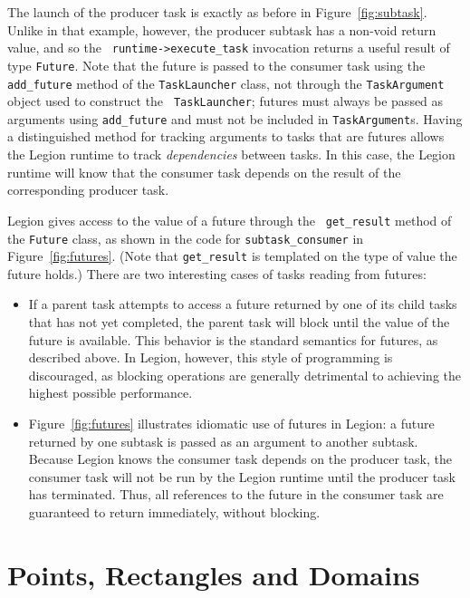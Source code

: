 \documentclass[11pt]{book}
\begin{document}
The launch of the producer task is exactly as before in
Figure~\ref{fig:subtask}.  Unlike in that example, however, the
producer subtask has a non-void return value, and so the {\tt
  runtime->execute\_task} invocation returns a useful result of type
{\tt Future}.  Note that the future is passed to the consumer task
using the {\tt add\_future} method of the {\tt TaskLauncher} class, not
through the {\tt TaskArgument} object used to construct the {\tt
  TaskLauncher}; futures must always be passed as arguments using {\tt add\_future}
and must not be included in {\tt TaskArgument}s.  Having a distinguished method for tracking arguments
to tasks that are futures allows the Legion runtime to track 
{\em dependencies} between tasks.  In this case, the Legion runtime 
will know that the consumer task depends on the result of the corresponding
producer task.

Legion gives access to the value of a future through the {\tt
  get\_result} method of the {\tt Future} class, as shown in the code
for {\tt subtask\_consumer} in Figure~\ref{fig:futures}.  (Note that
{\tt get\_result} is templated on the type of value the future holds.)
There are two interesting cases of tasks reading from futures:
\begin{itemize}

\item If a parent task attempts to access a future returned
by one of its child tasks that has not yet completed, the parent task
will block until the value of the future is available.  This behavior is the
standard semantics for futures, as described above.  In Legion, however,
this style of programming is discouraged, as blocking operations are 
generally detrimental to achieving the highest possible performance.

\item Figure~\ref{fig:futures} illustrates idiomatic use of futures in Legion:
a future returned by one subtask is passed as an argument to another subtask.
Because Legion knows the consumer task depends on the producer task, the consumer
task will not be run by the Legion runtime until the producer task has terminated.
Thus, all references to the future in the consumer task are guaranteed to 
return immediately, without blocking.

\end{itemize}

\section{Points, Rectangles and Domains}
\end{document}
